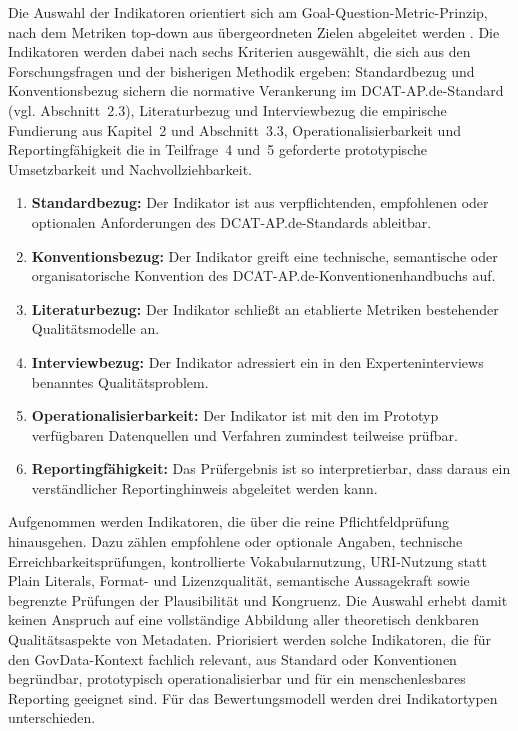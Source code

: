Die Auswahl der Indikatoren orientiert sich am Goal-Question-Metric-Prinzip, nach dem Metriken top-down aus übergeordneten Zielen abgeleitet werden \cite{Basili1994GQM}. Die Indikatoren werden dabei nach sechs Kriterien ausgewählt, die sich aus den Forschungsfragen und der bisherigen Methodik ergeben:
Standardbezug und Konventionsbezug sichern die normative Verankerung im DCAT-AP.de-Standard (vgl. Abschnitt~2.3), Literaturbezug und Interviewbezug die empirische Fundierung aus Kapitel~2 und Abschnitt~3.3, Operationalisierbarkeit und Reportingfähigkeit die in Teilfrage~4 und~5 geforderte prototypische Umsetzbarkeit und Nachvollziehbarkeit.

\begin{enumerate}
    \item \textbf{Standardbezug:} Der Indikator ist aus verpflichtenden, empfohlenen oder optionalen Anforderungen des DCAT-AP.de-Standards ableitbar.
    \item \textbf{Konventionsbezug:} Der Indikator greift eine technische, semantische oder organisatorische Konvention des DCAT-AP.de-Konventionenhandbuchs auf.
    \item \textbf{Literaturbezug:} Der Indikator schließt an etablierte Metriken bestehender Qualitätsmodelle an.
    \item \textbf{Interviewbezug:} Der Indikator adressiert ein in den Experteninterviews benanntes Qualitätsproblem.
    \item \textbf{Operationalisierbarkeit:} Der Indikator ist mit den im Prototyp verfügbaren Datenquellen und Verfahren zumindest teilweise prüfbar.
    \item \textbf{Reportingfähigkeit:} Das Prüfergebnis ist so interpretierbar, dass daraus ein verständlicher Reportinghinweis abgeleitet werden kann.
\end{enumerate}

Aufgenommen werden Indikatoren, die über die reine Pflichtfeldprüfung hinausgehen. Dazu zählen empfohlene oder optionale Angaben, technische Erreichbarkeitsprüfungen, kontrollierte Vokabularnutzung, URI-Nutzung statt Plain Literals, Format- und Lizenzqualität, semantische Aussagekraft sowie begrenzte Prüfungen der Plausibilität und Kongruenz. Die Auswahl erhebt damit keinen Anspruch auf eine vollständige Abbildung aller theoretisch denkbaren Qualitätsaspekte von Metadaten. Priorisiert werden solche Indikatoren, die für den GovData-Kontext fachlich relevant, aus Standard oder Konventionen begründbar, prototypisch operationalisierbar und für ein menschenlesbares Reporting geeignet sind.
Für das Bewertungsmodell werden drei Indikatortypen unterschieden. 

